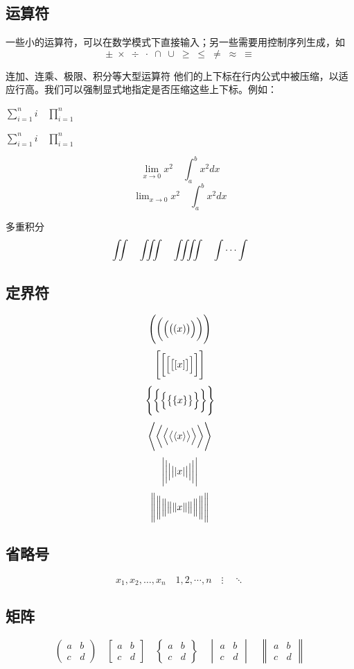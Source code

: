 \subsection{运算符} 

一些小的运算符，可以在数学模式下直接输入；另一些需要用控制序列生成，如
\[ \pm\; \times \; \div\; \cdot\; \cap\; \cup\;
\geq\; \leq\; \neq\; \approx \; \equiv \]

连加、连乘、极限、积分等大型运算符 %
他们的上下标在行内公式中被压缩，以适应行高。我们可以强制显式地指定是否压缩这些上下标。例如：

$ \sum_{i=1}^n i\quad \prod_{i=1}^n $ 

$ \sum\limits _{i=1}^n i\quad \prod\limits _{i=1}^n $

\[ \lim_{x\to0}x^2 \quad \int_a^b x^2 dx \]
\[ \lim\nolimits _{x\to0}x^2\quad \int\nolimits_a^b x^2 dx \]

多重积分
\[ \iint\quad \iiint\quad \iiiint\quad \idotsint \]

\subsection{定界符}

\[ \Biggl(\biggl(\Bigl(\bigl((x)\bigr)\Bigr)\biggr)\Biggr) \]
\[ \Biggl[\biggl[\Bigl[\bigl[[x]\bigr]\Bigr]\biggr]\Biggr] \]
\[ \Biggl \{\biggl \{\Bigl \{\bigl \{\{x\}\bigr \}\Bigr \}\biggr \}\Biggr\} \]
\[ \Biggl\langle\biggl\langle\Bigl\langle\bigl\langle\langle x
\rangle\bigr\rangle\Bigr\rangle\biggr\rangle\Biggr\rangle \]
\[ \Biggl\lvert\biggl\lvert\Bigl\lvert\bigl\lvert\lvert x
\rvert\bigr\rvert\Bigr\rvert\biggr\rvert\Biggr\rvert \]
\[ \Biggl\lVert\biggl\lVert\Bigl\lVert\bigl\lVert\lVert x
\rVert\bigr\rVert\Bigr\rVert\biggr\rVert\Biggr\rVert \]

\subsection{省略号}
\[ x_1,x_2,\dots ,x_n\quad 1,2,\cdots ,n\quad
\vdots\quad \ddots \]

\subsection{矩阵}
\[ \begin{pmatrix} a&b\\c&d \end{pmatrix} \quad
\begin{bmatrix} a&b\\c&d \end{bmatrix} \quad
\begin{Bmatrix} a&b\\c&d \end{Bmatrix} \quad
\begin{vmatrix} a&b\\c&d \end{vmatrix} \quad
\begin{Vmatrix} a&b\\c&d \end{Vmatrix} \]

